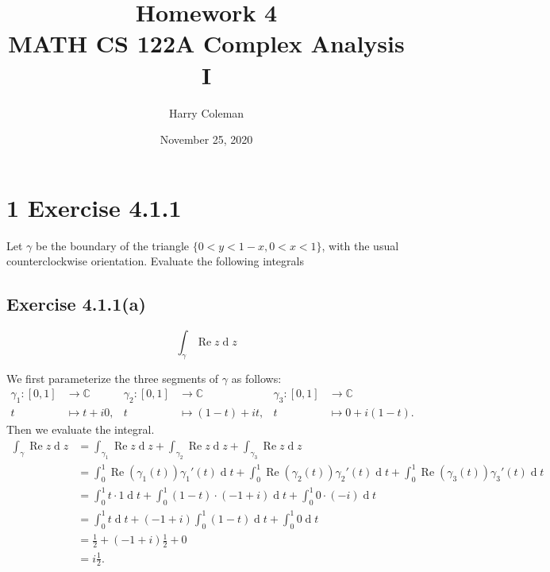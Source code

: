 \documentclass[12pt]{article}
\newenvironment{problem}
    {\begin{lrbox}{\mybox}\begin{minipage}{0.98\textwidth}}
    {\end{minipage}\end{lrbox}\framebox[\textwidth]{\usebox{\mybox}}}
\newcommand{\C}{\mathbb{C}} %
\newcommand{\<}{\left\langle} %
\renewcommand{\>}{\right\rangle} %
\renewcommand{\Re}{\operatorname{Re}} %
\renewcommand{\d}[1]{\operatorname{d}\!#1} %
\begin{document}
 
\title{Homework 4\\
    \large MATH CS 122A Complex Analysis I
}
\author{Harry Coleman}
\date{November 25, 2020}
\maketitle

\section*{1 Exercise 4.1.1}
\begin{problem}
    Let $\gamma$ be the boundary of the triangle $\{0<y<1-x, 0<x<1\}$, with the usual counterclockwise orientation. Evaluate the following integrals
\end{problem}

\subsection*{Exercise 4.1.1(a)}
\begin{problem}
    \[\int_\gamma\Re z \d{z}\]
\end{problem}
\medskip

We first parameterize the three segments of $\gamma$ as follows:
\begin{align*}
    \gamma_1:[0,1] &\to \C & \gamma_2:[0,1] &\to \C & \gamma_3:[0,1] &\to \C\\
        t &\mapsto t + i0, & t &\mapsto (1-t) + it, & t &\mapsto 0 + i(1-t).
\end{align*}
Then we evaluate the integral.
\begin{align*}
    \int_\gamma\Re z \d{z}
        &= \int_{\gamma_1}\Re z \d{z} + \int_{\gamma_2}\Re z \d{z} + \int_{\gamma_3}\Re z \d{z} \\
        &= \int_0^1\Re(\gamma_1(t))\gamma_1'(t) \d{t} + \int_0^1\Re(\gamma_2(t))\gamma_2'(t) \d{t} + \int_0^1\Re(\gamma_3(t))\gamma_3'(t) \d{t} \\
        &= \int_0^1 t\cdot 1\d{t} + \int_0^1 (1-t)\cdot(-1+i)\d{t} + \int_0^1 0\cdot(-i)\d{t} \\
        &= \int_0^1 t \d{t} + (-1+i)\int_0^1(1-t)\d{t} + \int_0^1 0 \d{t} \\
        &= \frac12 + (-1+i)\frac12 + 0 \\
        &= i\frac12.
\end{align*}
\end{document}
